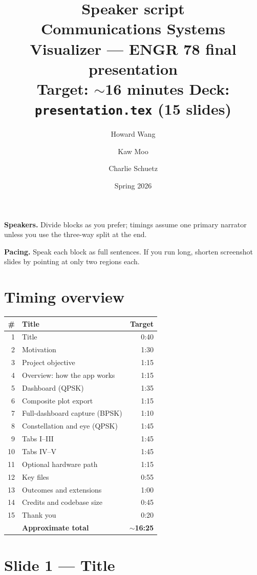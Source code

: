 \documentclass[11pt,a4paper]{article}
\title{\textbf{Speaker script}\\[0.25em]
\large Communications Systems Visualizer --- ENGR 78 final presentation\\
\normalsize Target: $\sim$16 minutes \quad Deck: \texttt{presentation.tex} (15 slides)}
\author{Howard Wang \and Kaw Moo \and Charlie Schuetz}
\date{Spring 2026}
\begin{document}
\maketitle

\noindent\textbf{Speakers.} Divide blocks as you prefer; timings assume one primary narrator unless you use the three-way split at the end.

\medskip
\noindent\textbf{Pacing.} Speak each block as full sentences. If you run long, shorten screenshot slides by pointing at only two regions each.

\section*{Timing overview}

\begin{center}
\begin{tabular}{@{}r p{6.8cm} r@{}}
\toprule
\textbf{\#} & \textbf{Title} & \textbf{Target} \\
\midrule
1 & Title & 0:40 \\
2 & Motivation & 1:30 \\
3 & Project objective & 1:15 \\
4 & Overview: how the app works & 1:15 \\
5 & Dashboard (QPSK) & 1:35 \\
6 & Composite plot export & 1:15 \\
7 & Full-dashboard capture (BPSK) & 1:10 \\
8 & Constellation and eye (QPSK) & 1:45 \\
9 & Tabs I--III & 1:45 \\
10 & Tabs IV--V & 1:45 \\
11 & Optional hardware path & 1:15 \\
12 & Key files & 0:55 \\
13 & Outcomes and extensions & 1:00 \\
14 & Credits and codebase size & 0:45 \\
15 & Thank you & 0:20 \\
\midrule
& \textbf{Approximate total} & \textbf{$\sim$16:25} \\
\bottomrule
\end{tabular}
\end{center}

\section{Slide 1 --- Title}
\end{document}
